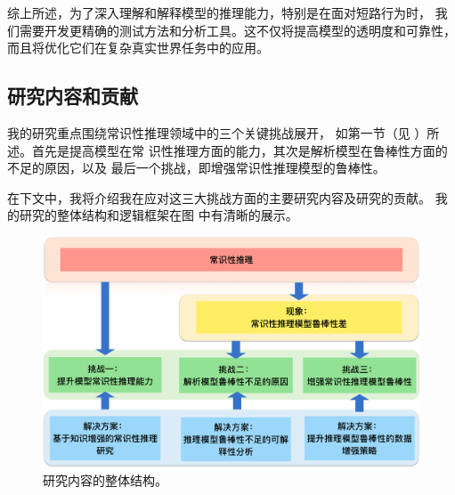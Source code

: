 综上所述，为了深入理解和解释模型的推理能力，特别是在面对短路行为时，
我们需要开发更精确的测试方法和分析工具。这不仅将提高模型的透明度和可靠性，
而且将优化它们在复杂真实世界任务中的应用。


%
%
%
%
%
%
%
%
%
%
\fi

\subsection{研究内容和贡献}
我的研究重点围绕常识性推理领域中的三个关键挑战展开，
如第一节（见 ）所述。首先是提高模型在常
识性推理方面的能力，其次是解析模型在鲁棒性方面的不足的原因，以及
最后一个挑战，即增强常识性推理模型的鲁棒性。

在下文中，我将介绍我在应对这三大挑战方面的主要研究内容及研究的贡献。
我的研究的整体结构和逻辑框架在图  中有清晰的展示。

\begin{figure}[th]
  \centering\includegraphics[width=5in]{figures/xulun/structure.eps}
  \caption{研究内容的整体结构。}
  \label{fig1:structure}
  \end{figure}


